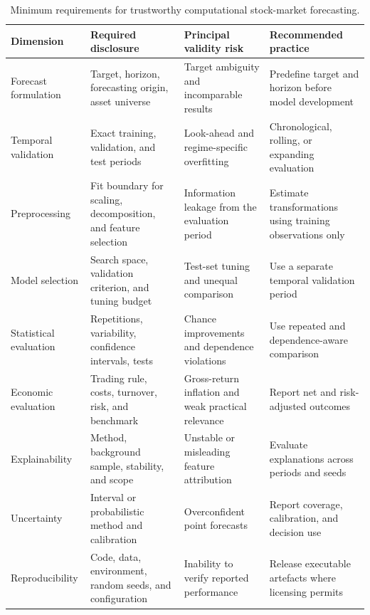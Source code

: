 \documentclass[pdflatex,sn-mathphys-num]{sn-jnl}%
\theoremstyle{thmstyleone}%
\theoremstyle{thmstyletwo}%
\theoremstyle{thmstylethree}%
\begin{document}
\begin{table}[!t]
\centering
\caption{Minimum requirements for trustworthy computational
stock-market forecasting.}
\label{tab:trustworthy_framework}
\small
\begin{tabular}{p{2.6cm}p{4.0cm}p{4.2cm}p{3.0cm}}
\toprule
Dimension & Required disclosure & Principal validity risk
& Recommended practice \\
\midrule
Forecast formulation
& Target, horizon, forecasting origin, asset universe
& Target ambiguity and incomparable results
& Predefine target and horizon before model development \\

Temporal validation
& Exact training, validation, and test periods
& Look-ahead and regime-specific overfitting
& Chronological, rolling, or expanding evaluation \\

Preprocessing
& Fit boundary for scaling, decomposition, and feature selection
& Information leakage from the evaluation period
& Estimate transformations using training observations only \\

Model selection
& Search space, validation criterion, and tuning budget
& Test-set tuning and unequal comparison
& Use a separate temporal validation period \\

Statistical evaluation
& Repetitions, variability, confidence intervals, tests
& Chance improvements and dependence violations
& Use repeated and dependence-aware comparison \\

Economic evaluation
& Trading rule, costs, turnover, risk, and benchmark
& Gross-return inflation and weak practical relevance
& Report net and risk-adjusted outcomes \\

Explainability
& Method, background sample, stability, and scope
& Unstable or misleading feature attribution
& Evaluate explanations across periods and seeds \\

Uncertainty
& Interval or probabilistic method and calibration
& Overconfident point forecasts
& Report coverage, calibration, and decision use \\

Reproducibility
& Code, data, environment, random seeds, and configuration
& Inability to verify reported performance
& Release executable artefacts where licensing permits \\
\bottomrule
\end{tabular}
\end{table}
\end{document}
